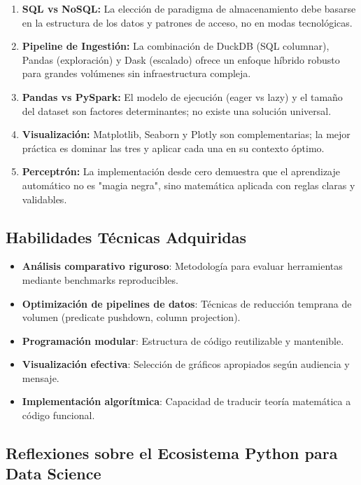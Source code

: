 \documentclass[12pt]{src/formato_utem}
\begin{document}
\begin{enumerate}
    \item \textbf{SQL vs NoSQL:} La elección de paradigma de almacenamiento debe basarse en la estructura de los datos y patrones de acceso, no en modas tecnológicas.
    
    \item \textbf{Pipeline de Ingestión:} La combinación de DuckDB (SQL columnar), Pandas (exploración) y Dask (escalado) ofrece un enfoque híbrido robusto para grandes volúmenes sin infraestructura compleja.
    
    \item \textbf{Pandas vs PySpark:} El modelo de ejecución (eager vs lazy) y el tamaño del dataset son factores determinantes; no existe una solución universal.
    
    \item \textbf{Visualización:} Matplotlib, Seaborn y Plotly son complementarias; la mejor práctica es dominar las tres y aplicar cada una en su contexto óptimo.
    
    \item \textbf{Perceptrón:} La implementación desde cero demuestra que el aprendizaje automático no es "magia negra", sino matemática aplicada con reglas claras y validables.
\end{enumerate}

\subsection{Habilidades Técnicas Adquiridas}

\begin{itemize}
    \item \textbf{Análisis comparativo riguroso}: Metodología para evaluar herramientas mediante benchmarks reproducibles.
    \item \textbf{Optimización de pipelines de datos}: Técnicas de reducción temprana de volumen (predicate pushdown, column projection).
    \item \textbf{Programación modular}: Estructura de código reutilizable y mantenible.
    \item \textbf{Visualización efectiva}: Selección de gráficos apropiados según audiencia y mensaje.
    \item \textbf{Implementación algorítmica}: Capacidad de traducir teoría matemática a código funcional.
\end{itemize}

\subsection{Reflexiones sobre el Ecosistema Python para Data Science}
\end{document}
